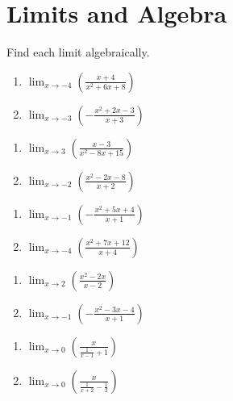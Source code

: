 \chapter{Limits and Algebra}

Find each limit algebraically.

\begin{multicols}{2}
\begin{enumerate}
	\item $\displaystyle \lim_{x \to -4} \left(\frac{x+4}{x^2+6x+8}\right)$
	\item $\displaystyle \lim_{x \to -3} \left(-\frac{x^2+2x-3}{x+3}\right)$
\end{enumerate}	\setcounter{Review}{\value{enumi}}
\end{multicols}
\begin{multicols}{2}
\begin{enumerate}	\setcounter{enumi}{\value{Review}}
	\item $\displaystyle \lim_{x \to 3} \left(\frac{x-3}{x^2-8x+15}\right)$
	\item $\displaystyle \lim_{x \to -2} \left(\frac{x^2-2x-8}{x+2}\right)$
\end{enumerate}	\setcounter{Review}{\value{enumi}}
\end{multicols}
\begin{multicols}{2}
\begin{enumerate}	\setcounter{enumi}{\value{Review}}
	\item $\displaystyle \lim_{x \to -1} \left(-\frac{x^2+5x+4}{x+1}\right)$
	\item $\displaystyle \lim_{x \to -4} \left(\frac{x^2+7x+12}{x+4}\right)$
\end{enumerate}	\setcounter{Review}{\value{enumi}}
\end{multicols}
\begin{multicols}{2}
\begin{enumerate}	\setcounter{enumi}{\value{Review}}
	\item $\displaystyle \lim_{x \to 2} \left(\frac{x^2-2x}{x-2}\right)$
	\item $\displaystyle \lim_{x \to -1} \left(-\frac{x^2-3x-4}{x+1}\right)$
\end{enumerate}	\setcounter{Review}{\value{enumi}}
\end{multicols}
\begin{multicols}{2}
\begin{enumerate}	\setcounter{enumi}{\value{Review}}	
	\item $\displaystyle \lim_{x \to 0} \left(\frac{x}{\frac{1}{x-1}+1}\right)$
	\item $\displaystyle \lim_{x \to 0} \left(\frac{x}{\frac{1}{x+2}-\frac{1}{2}}\right)$
\end{enumerate}	\setcounter{Review}{\value{enumi}}
\end{multicols}
